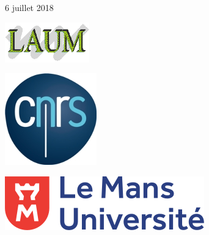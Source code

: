 \documentclass[twoside,openright]{report}
\begin{document}
\begin{titlepage}


{\large 6 juillet 2018}\\[1cm] %

\hspace{2cm}
\begin{minipage}[c]{0.4\linewidth}
\centering
\hspace{-3cm}
\vspace{1.2cm}
\includegraphics[scale=0.9]{logo_LAUM.png}\\[1cm]  
\end{minipage}
\begin{minipage}[c]{0.4\linewidth}
\centering
\hspace{-1cm}
\vspace{1.2cm}
\includegraphics[scale=1.6]{logo_cnrs.jpg}\\[1cm]  
\end{minipage}
\begin{minipage}[l]{0.8\linewidth}
\centering
\hspace{1.3cm}
\vspace{0.5cm}
\includegraphics[scale=0.5]{Logo_LeMansUniv.png}\\[1cm]  
\end{minipage}
\end{titlepage}
\newpage
\null
\end{document}
